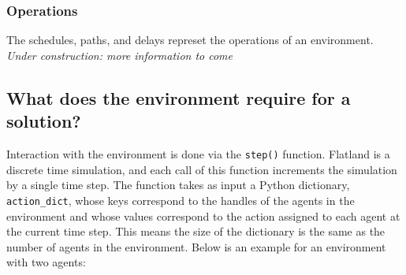\subsubsection{Operations}
The schedules, paths, and delays represet the operations of an environment.  \textit{Under construction: more information to come}







\subsection{What does the environment require for a solution?}
Interaction with the environment is done via the \texttt{step()} function.  Flatland is a discrete time simulation, and each call of this function increments the simulation by a single time step.  The function takes as input a Python dictionary, \texttt{action\_dict}, whose keys correspond to the handles of the agents in the environment and whose values correspond to the action assigned to each agent at the current time step.  This means the size of the dictionary is the same as the number of agents in the environment.  Below is an example for an environment with two agents:


